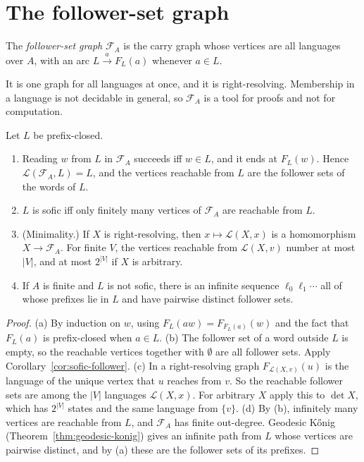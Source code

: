 \section{The follower-set graph}\label{sec:follower}

\begin{definition}\label{def:follower-graph}
The \emph{follower-set graph} \(\mathcal F_A\) is the carry graph whose vertices are all
languages over \(A\), with an arc \(L\xrightarrow{a}F_L(a)\) whenever \(a\in L\).
\end{definition}

It is one graph for all languages at once, and it is right-resolving. Membership in a language
is not decidable in general, so \(\mathcal F_A\) is a tool for proofs and not for computation.

\begin{theorem}\label{thm:follower-graph}
Let \(L\) be prefix-closed.
\begin{enumerate}[label=(\alph*)]
\item Reading \(w\) from \(L\) in \(\mathcal F_A\) succeeds iff \(w\in L\), and it ends at
  \(F_L(w)\). Hence \(\mathcal L(\mathcal F_A,L)=L\), and the vertices reachable from \(L\) are
  the follower sets of the words of \(L\).
\item \(L\) is sofic iff only finitely many vertices of \(\mathcal F_A\) are reachable from
  \(L\).
\item (Minimality.) If \(X\) is right-resolving, then \(x\mapsto\mathcal L(X,x)\) is a
  homomorphism \(X\to\mathcal F_A\). For finite \(V\), the vertices reachable from
  \(\mathcal L(X,v)\) number at most \(|V|\), and at most \(2^{|V|}\) if \(X\) is arbitrary.
\item If \(A\) is finite and \(L\) is not sofic, there is an infinite sequence
  \(\ell_0\ell_1\cdots\) all of whose prefixes lie in \(L\) and have pairwise distinct follower
  sets.
\end{enumerate}
\end{theorem}

\begin{proof}
(a) By induction on \(w\), using \(F_L(aw)=F_{F_L(a)}(w)\) and the fact that \(F_L(a)\) is
prefix-closed when \(a\in L\). (b) The follower set of a word outside \(L\) is empty, so the
reachable vertices together with \(\emptyset\) are all follower sets. Apply
Corollary~\ref{cor:sofic-follower}. (c) In a right-resolving graph \(F_{\mathcal L(X,v)}(u)\) is
the language of the unique vertex that \(u\) reaches from \(v\). So the reachable follower sets
are among the \(|V|\) languages \(\mathcal L(X,x)\). For arbitrary \(X\) apply this to
\(\det X\), which has \(2^{|V|}\) states and the same language from \(\{v\}\). (d) By (b),
infinitely many vertices are reachable from \(L\), and \(\mathcal F_A\) has finite out-degree.
Geodesic Kőnig (Theorem~\ref{thm:geodesic-konig}) gives an infinite path from \(L\) whose
vertices are pairwise distinct, and by (a) these are the follower sets of its prefixes.
\end{proof}

